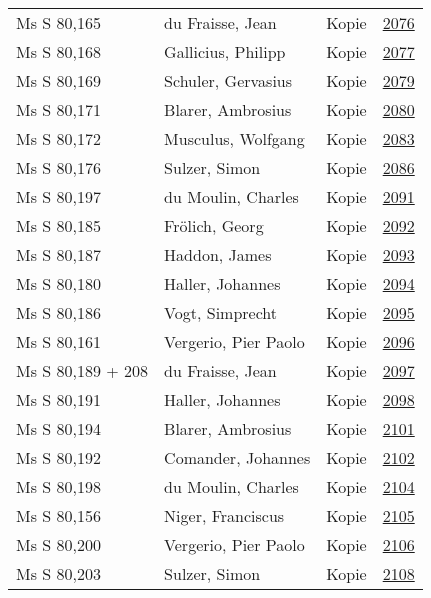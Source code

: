 \documentclass[10pt,a4paper,landscape]{report}
\begin{document}
\begin{longtable}{p{16cm}p{4cm}lr}
Ms S 80,165	&	du Fraisse, Jean	&	Kopie	&	\href{http://130.60.24.72/assignment/2076}{2076}\\
Ms S 80,168	&	Gallicius, Philipp	&	Kopie	&	\href{http://130.60.24.72/assignment/2077}{2077}\\
Ms S 80,169	&	Schuler, Gervasius	&	Kopie	&	\href{http://130.60.24.72/assignment/2079}{2079}\\
Ms S 80,171	&	Blarer, Ambrosius	&	Kopie	&	\href{http://130.60.24.72/assignment/2080}{2080}\\
Ms S 80,172	&	Musculus, Wolfgang	&	Kopie	&	\href{http://130.60.24.72/assignment/2083}{2083}\\
Ms S 80,176	&	Sulzer, Simon	&	Kopie	&	\href{http://130.60.24.72/assignment/2086}{2086}\\
Ms S 80,197	&	du Moulin, Charles	&	Kopie	&	\href{http://130.60.24.72/assignment/2091}{2091}\\
Ms S 80,185	&	Frölich, Georg	&	Kopie	&	\href{http://130.60.24.72/assignment/2092}{2092}\\
Ms S 80,187	&	Haddon, James	&	Kopie	&	\href{http://130.60.24.72/assignment/2093}{2093}\\
Ms S 80,180	&	Haller, Johannes	&	Kopie	&	\href{http://130.60.24.72/assignment/2094}{2094}\\
Ms S 80,186	&	Vogt, Simprecht	&	Kopie	&	\href{http://130.60.24.72/assignment/2095}{2095}\\
Ms S 80,161	&	Vergerio, Pier Paolo	&	Kopie	&	\href{http://130.60.24.72/assignment/2096}{2096}\\
Ms S 80,189 + 208	&	du Fraisse, Jean	&	Kopie	&	\href{http://130.60.24.72/assignment/2097}{2097}\\
Ms S 80,191	&	Haller, Johannes	&	Kopie	&	\href{http://130.60.24.72/assignment/2098}{2098}\\
Ms S 80,194	&	Blarer, Ambrosius	&	Kopie	&	\href{http://130.60.24.72/assignment/2101}{2101}\\
Ms S 80,192	&	Comander, Johannes	&	Kopie	&	\href{http://130.60.24.72/assignment/2102}{2102}\\
Ms S 80,198	&	du Moulin, Charles	&	Kopie	&	\href{http://130.60.24.72/assignment/2104}{2104}\\
Ms S 80,156	&	Niger, Franciscus	&	Kopie	&	\href{http://130.60.24.72/assignment/2105}{2105}\\
Ms S 80,200	&	Vergerio, Pier Paolo	&	Kopie	&	\href{http://130.60.24.72/assignment/2106}{2106}\\
Ms S 80,203	&	Sulzer, Simon	&	Kopie	&	\href{http://130.60.24.72/assignment/2108}{2108}\\

\end{longtable}
\end{document}
